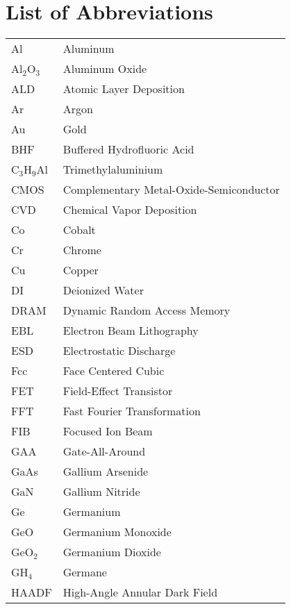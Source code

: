 
\chapter*{List of Abbreviations}
\label{sec:ListOfAbbreviations}

\begin{tabular}{l l}

Al & Aluminum \\
Al$_2$O$_3$ & Aluminum Oxide \\
ALD & Atomic Layer Deposition \\
Ar & Argon \\
Au & Gold \\
BHF & Buffered Hydrofluoric Acid\\
C$_3$H$_9$Al & Trimethylaluminium \\
CMOS & Complementary Metal-Oxide-Semiconductor \\
CVD & Chemical Vapor Deposition \\
Co & Cobalt \\
Cr & Chrome \\
Cu & Copper \\
DI & Deionized Water \\
DRAM & Dynamic Random Access Memory \\
EBL & Electron Beam Lithography \\
ESD & Electrostatic Discharge \\
Fcc & Face Centered Cubic \\
FET & Field-Effect Transistor \\
FFT & Fast Fourier Transformation \\
FIB & Focused Ion Beam \\
GAA & Gate-All-Around \\
GaAs & Gallium Arsenide \\
GaN & Gallium Nitride \\
Ge & Germanium \\
GeO & Germanium Monoxide \\
GeO$_2$ & Germanium Dioxide \\
GH$_4$ & Germane \\
HAADF & High-Angle Annular Dark Field \\

\end{tabular}

